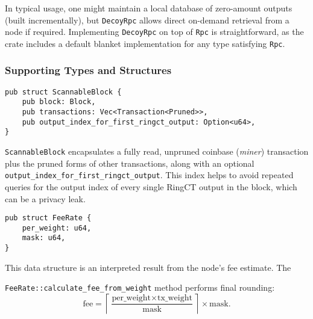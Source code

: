 In typical usage, one might maintain a local database of zero-amount outputs
(built incrementally), but \texttt{DecoyRpc} allows direct on-demand retrieval
from a node if required.  Implementing \texttt{DecoyRpc} on top of \texttt{Rpc}
is straightforward, as the crate includes a default blanket implementation for
any type satisfying \texttt{Rpc}.

\subsubsection{Supporting Types and Structures}
\label{sec:monero-rpc-supporting-types}


\label{sec:monero-rpc-supporting-types-scannableblock}

\begin{verbatim}
pub struct ScannableBlock {
    pub block: Block,
    pub transactions: Vec<Transaction<Pruned>>,
    pub output_index_for_first_ringct_output: Option<u64>,
}
\end{verbatim}

\texttt{ScannableBlock} encapsulates a fully read, unpruned coinbase
(\textit{miner}) transaction plus the pruned forms of other transactions, along
with an optional \texttt{output\_index\_for\_first\_ringct\_output}.  This index
helps to avoid repeated queries for the output index of every single
RingCT output in the block, which can be a privacy leak.

\label{sec:monero-rpc-supporting-types-feerate}

\begin{verbatim}
pub struct FeeRate {
    per_weight: u64,
    mask: u64,
}
\end{verbatim}

This data structure is an interpreted result from the node’s fee estimate.  
The 

\texttt{FeeRate::calculate\_fee\_from\_weight} method performs final rounding:
\[
\text{fee} = \left\lceil \frac{\text{per\_weight}
             \times \text{tx\_weight}}{\text{mask}} \right\rceil
             \times \text{mask}.
\]


